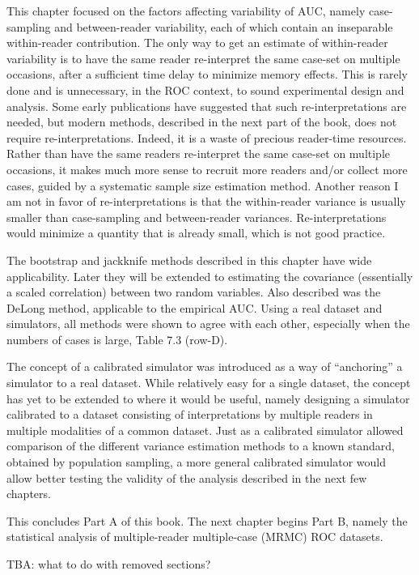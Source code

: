 \documentclass[
]{book}
\begin{document}
This chapter focused on the factors affecting variability of AUC, namely case-sampling and between-reader variability, each of which contain an inseparable within-reader contribution. The only way to get an estimate of within-reader variability is to have the same reader re-interpret the same case-set on multiple occasions, after a sufficient time delay to minimize memory effects. This is rarely done and is unnecessary, in the ROC context, to sound experimental design and analysis. Some early publications have suggested that such re-interpretations are needed, but modern methods, described in the next part of the book, does not require re-interpretations. Indeed, it is a waste of precious reader-time resources. Rather than have the same readers re-interpret the same case-set on multiple occasions, it makes much more sense to recruit more readers and/or collect more cases, guided by a systematic sample size estimation method. Another reason I am not in favor of re-interpretations is that the within-reader variance is usually smaller than case-sampling and between-reader variances. Re-interpretations would minimize a quantity that is already small, which is not good practice.

The bootstrap and jackknife methods described in this chapter have wide applicability. Later they will be extended to estimating the covariance (essentially a scaled correlation) between two random variables. Also described was the DeLong method, applicable to the empirical AUC. Using a real dataset and simulators, all methods were shown to agree with each other, especially when the numbers of cases is large, Table 7.3 (row-D).

The concept of a calibrated simulator was introduced as a way of ``anchoring'' a simulator to a real dataset. While relatively easy for a single dataset, the concept has yet to be extended to where it would be useful, namely designing a simulator calibrated to a dataset consisting of interpretations by multiple readers in multiple modalities of a common dataset. Just as a calibrated simulator allowed comparison of the different variance estimation methods to a known standard, obtained by population sampling, a more general calibrated simulator would allow better testing the validity of the analysis described in the next few chapters.

This concludes Part A of this book. The next chapter begins Part B, namely the statistical analysis of multiple-reader multiple-case (MRMC) ROC datasets.

TBA: what to do with removed sections?
\end{document}
